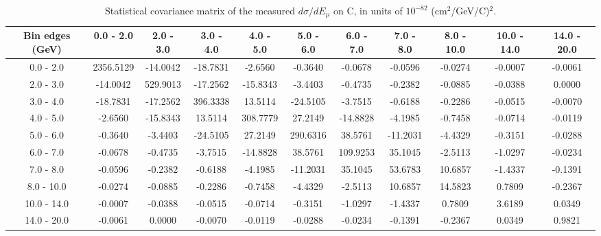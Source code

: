 \documentclass[aps,prl,twocolumn,superscriptaddress,nofootinbib]{revtex4-1}
\begin{document}
\begin{turnpage}
 \begin{table}[h!]
  \centering
  \caption{Statistical covariance matrix of the measured $d\sigma/dE_{\mu}$ on C, in units of $10^{-82}$ (cm$^{2}$/GeV/C)$^{2}$.}
    \begin{tabular}{c||cccccccccc}
      Bin edges (GeV) & 0.0 - 2.0 & 2.0 - 3.0 & 3.0 - 4.0 & 4.0 - 5.0 & 5.0 - 6.0 & 6.0 - 7.0 & 7.0 - 8.0 & 8.0 - 10.0 & 10.0 - 14.0 & 14.0 - 20.0 \\
\hline \hline
        0.0 - 2.0 & 2356.5129 & -14.0042 & -18.7831 & -2.6560 & -0.3640 & -0.0678 & -0.0596 & -0.0274 & -0.0007 & -0.0061 \\
        2.0 - 3.0 & -14.0042 & 529.9013 & -17.2562 & -15.8343 & -3.4403 & -0.4735 & -0.2382 & -0.0885 & -0.0388 &  0.0000 \\
        3.0 - 4.0 & -18.7831 & -17.2562 & 396.3338 & 13.5114 & -24.5105 & -3.7515 & -0.6188 & -0.2286 & -0.0515 & -0.0070 \\
        4.0 - 5.0 & -2.6560 & -15.8343 & 13.5114 & 308.7779 & 27.2149 & -14.8828 & -4.1985 & -0.7458 & -0.0714 & -0.0119 \\
        5.0 - 6.0 & -0.3640 & -3.4403 & -24.5105 & 27.2149 & 290.6316 & 38.5761 & -11.2031 & -4.4329 & -0.3151 & -0.0288 \\
        6.0 - 7.0 & -0.0678 & -0.4735 & -3.7515 & -14.8828 & 38.5761 & 109.9253 & 35.1045 & -2.5113 & -1.0297 & -0.0234 \\
        7.0 - 8.0 & -0.0596 & -0.2382 & -0.6188 & -4.1985 & -11.2031 & 35.1045 & 53.6783 & 10.6857 & -1.4337 & -0.1391 \\
       8.0 - 10.0 & -0.0274 & -0.0885 & -0.2286 & -0.7458 & -4.4329 & -2.5113 & 10.6857 & 14.5823 &  0.7809 & -0.2367 \\
      10.0 - 14.0 & -0.0007 & -0.0388 & -0.0515 & -0.0714 & -0.3151 & -1.0297 & -1.4337 &  0.7809 &  3.6189 &  0.0349 \\
      14.0 - 20.0 & -0.0061 &  0.0000 & -0.0070 & -0.0119 & -0.0288 & -0.0234 & -0.1391 & -0.2367 &  0.0349 &  0.9821 \\
    \end{tabular}
  \label{tablecov:C_Statistical_Emu}
  \end{table}
\end{turnpage}
\end{document}
